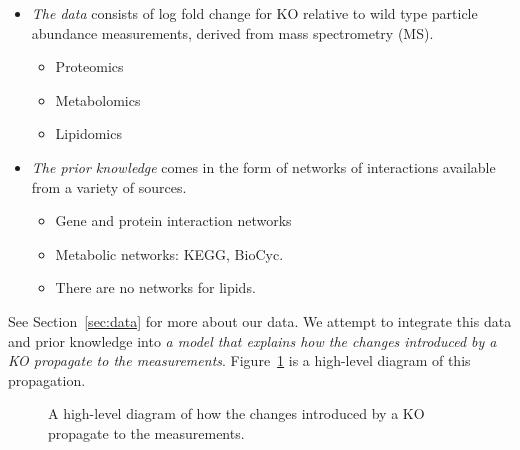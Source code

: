 \documentclass{article}
\begin{document}
\begin{itemize}
 \item \emph{The data} consists of log fold change for KO relative to wild type particle abundance measurements, derived from mass spectrometry (MS).
 \begin{itemize}
  \item Proteomics
  \item Metabolomics
  \item Lipidomics
 \end{itemize}
 \item \emph{The prior knowledge} comes in the form of networks of interactions available from a variety of sources.
 \begin{itemize}
  \item Gene and protein interaction networks
  \item Metabolic networks: KEGG, BioCyc.
  \item There are no networks for lipids.
 \end{itemize}
\end{itemize}

See Section~\ref{sec:data} for more about our data.
We attempt to integrate this data and prior knowledge into \emph{a model that explains how the changes introduced by a KO propagate to the measurements}.
Figure~\ref{fig:high-level} is a high-level diagram of this propagation.

\begin{figure}
\centering
{}
\caption{A high-level diagram of how the changes introduced by a KO propagate to the measurements.}
\label{fig:high-level}
\end{figure}
\end{document}
